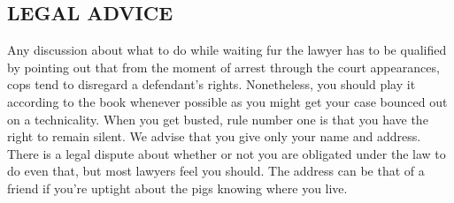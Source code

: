 \documentclass[11pt,twoside,a4paper]{book}
\begin{document}
\subsection{LEGAL ADVICE}
Any discussion about what to do while waiting fur the lawyer has to be qualified by pointing out that from the moment of arrest through the court appearances, cops tend to disregard a defendant's rights. Nonetheless, you should play it according to the book whenever possible as you might get your case bounced out on a technicality. When you get busted, rule number one is that you have the right to remain silent. We advise that you give only your name and address. There is a legal dispute about whether or not you are obligated under the law to do even that, but most lawyers feel you should. The address can be that of a friend if you're uptight about the pigs knowing where you live.
\end{document}
